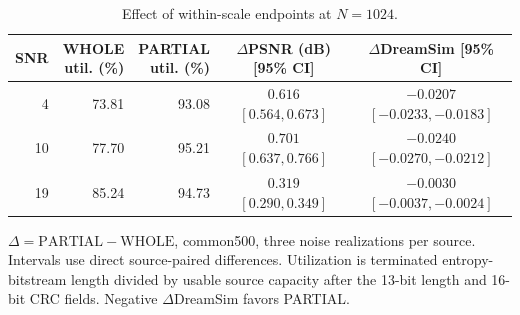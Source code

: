 \begin{table}[t]
\centering
\caption{Effect of within-scale endpoints at $N=1024$.}
\label{tab:within-scale}
\begingroup
\fontsize{8}{9.5}\selectfont
\setlength{\tabcolsep}{3pt}
\begin{tabular}{@{}r r r c c@{}}
\toprule
SNR & \shortstack{WHOLE\\util. (\%)} & \shortstack{PARTIAL\\util. (\%)} & \shortstack{$\Delta$PSNR (dB)\\{[95\% CI]}} & \shortstack{$\Delta$DreamSim\\{[95\% CI]}} \\
\midrule
4 & 73.81 & 93.08 & \shortstack{$0.616$\\[1pt]$[0.564, 0.673]$} & \shortstack{$-0.0207$\\[1pt]$[-0.0233, -0.0183]$} \\[3pt]
10 & 77.70 & 95.21 & \shortstack{$0.701$\\[1pt]$[0.637, 0.766]$} & \shortstack{$-0.0240$\\[1pt]$[-0.0270, -0.0212]$} \\[3pt]
19 & 85.24 & 94.73 & \shortstack{$0.319$\\[1pt]$[0.290, 0.349]$} & \shortstack{$-0.0030$\\[1pt]$[-0.0037, -0.0024]$} \\[3pt]
\bottomrule
\end{tabular}
\endgroup
\par\smallskip
\begin{minipage}{\linewidth}\fontsize{7.5}{9}\selectfont
$\Delta=\mathrm{PARTIAL}-\mathrm{WHOLE}$, common500, three noise realizations per source. Intervals use direct source-paired differences. Utilization is terminated entropy-bitstream length divided by usable source capacity after the 13-bit length and 16-bit CRC fields. Negative $\Delta$DreamSim favors PARTIAL.
\end{minipage}
\end{table}

